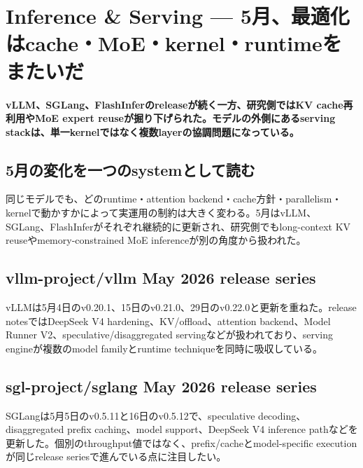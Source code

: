 \section{Inference \& Serving — 5月、最適化はcache・MoE・kernel・runtimeをまたいだ}
\noindent\textbf{vLLM、SGLang、FlashInferのreleaseが続く一方、研究側ではKV cache再利用やMoE expert reuseが掘り下げられた。モデルの外側にあるserving stackは、単一kernelではなく複数layerの協調問題になっている。}\autocite{src-3707e05fd2a3,src-5a693cfc6852,src-69c5523286bd,src-74a7052acd7a,src-77e29e3fac8f,src-80b8d67933c0,src-ba75040df3fc,src-c97320147e8c}

\subsection{5月の変化を一つのsystemとして読む}

同じモデルでも、どのruntime・attention backend・cache方針・parallelism・kernelで動かすかによって実運用の制約は大きく変わる。5月はvLLM、SGLang、FlashInferがそれぞれ継続的に更新され、研究側でもlong-context KV reuseやmemory-constrained MoE inferenceが別の角度から扱われた。\autocite{src-3707e05fd2a3,src-5a693cfc6852,src-69c5523286bd,src-74a7052acd7a,src-77e29e3fac8f,src-80b8d67933c0,src-ba75040df3fc,src-c97320147e8c}


\subsection{vllm-project/vllm May 2026 release series}

vLLMは5月4日のv0.20.1、15日のv0.21.0、29日のv0.22.0と更新を重ねた。release notesではDeepSeek V4 hardening、KV/offload、attention backend、Model Runner V2、speculative/disaggregated servingなどが扱われており、serving engineが複数のmodel familyとruntime techniqueを同時に吸収している。\autocite{src-77e29e3fac8f,src-80b8d67933c0,src-c97320147e8c}


\subsection{sgl-project/sglang May 2026 release series}

SGLangは5月5日のv0.5.11と16日のv0.5.12で、speculative decoding、disaggregated prefix caching、model support、DeepSeek V4 inference pathなどを更新した。個別のthroughput値ではなく、prefix/cacheとmodel-specific executionが同じrelease seriesで進んでいる点に注目したい。\autocite{src-5a693cfc6852,src-69c5523286bd}


